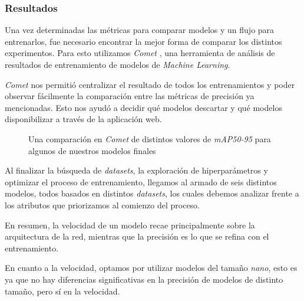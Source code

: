 \documentclass[a4paper]{article}
\begin{document}
\subsubsection{Resultados}

Una vez determinadas las métricas para comparar modelos y un flujo para entrenarlos, fue necesario encontrar la mejor forma de comparar los distintos experimentos. Para esto utilizamos \textit{Comet} \cite{comet}, una herramienta de análisis de resultados de entrenamiento de modelos de \textit{Machine Learning}.

\textit{Comet} nos permitió centralizar el resultado de todos los entrenamientos y poder observar fácilmente la comparación entre las métricas de precisión ya mencionadas. Esto nos ayudó a decidir qué modelos descartar y qué modelos disponibilizar a través de la aplicación web.

\begin{figure}[H]
\caption{Una comparación en \textit{Comet} de distintos valores de \textit{mAP50-95} para algunos de nuestros modelos finales}
\end{figure}

Al finalizar la búsqueda de \textit{datasets}, la exploración de hiperparámetros y optimizar el proceso de entrenamiento, llegamos al armado de seis distintos modelos, todos basados en distintos \textit{datasets}, los cuales debemos analizar frente a los atributos que priorizamos al comienzo del proceso. \medskip

En resumen, la velocidad de un modelo recae principalmente sobre la arquitectura de la red, mientras que la precisión es lo que se refina con el entrenamiento.

En cuanto a la velocidad, optamos por utilizar modelos del tamaño \textit{nano}, esto es ya que no hay diferencias significativas en la precisión de modelos de distinto tamaño, pero sí en la velocidad.
\end{document}

